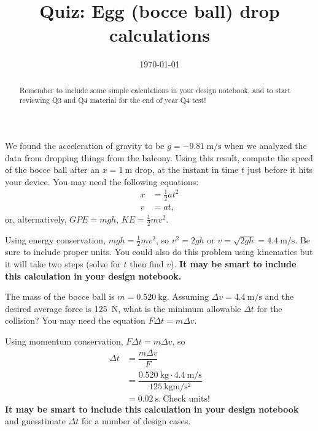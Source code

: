 \documentclass [hw,addpoints,noanswers]{exam}
\title{Quiz: Egg (bocce ball) drop calculations}
\author{\mobeardInstructorShort}
\date{\today}
\begin{document}
\maketitle

\begin{abstract}
Remember to include some simple calculations in your design notebook, and to start reviewing Q3 and Q4 material for the end of year Q4 test! 
\end{abstract}

\begin{questions}
\question[3] We found the acceleration of gravity to be $g=\SI{-9.81}{\meter\per\second}$ when we analyzed the data from dropping things from the balcony. Using this result, compute the speed of the bocce ball after an $x=\SI{1}{\meter}$ drop, at the instant in time $t$ just before it hits your device. You may need the following equations: 
\begin{align*}
x &= \frac{1}{2} a t^2 \\
v &= a t,
\end{align*}
or, alternatively, $GPE=mgh$, $KE=\frac{1}{2}mv^2$.
\begin{solution}[2.5in]
Using energy conservation, $mgh=\frac{1}{2}mv^2$, so $v^2 = 2gh$ or $v=\sqrt{2 g h}=\SI{4.4}{\meter\per\second}.$ Be sure to include proper units. You could also do this problem using kinematics but it will take two steps (solve for $t$ then find $v$). \textbf{It may be smart to include this calculation in your design notebook.}
\end{solution}

\question[2] The mass of the bocce ball is $m=\SI{0.520}{\kilo\gram}$. Assuming $\Delta v=\SI{4.4}{\meter\per\second}$ and the desired average force is \SI{125}{\newton}, what is the minimum allowable $\Delta t$ for the collision? You may need the equation $F \Delta t = m \Delta v$. 
\begin{solution}[2.5in]
Using momentum conservation, $F \Delta t = m \Delta v$, so
\begin{align*}
\Delta t &= \dfrac{m \Delta v}{F} \\
&= \dfrac{\SI{0.520}{\kilo\gram} \cdot \SI{4.4}{\meter\per\second}}{\SI{125}{\kilo\gram\meter\per\second\squared}} \\
&= \SI{0.02}{\second}.\ \text{Check units!} 
\end{align*}
\textbf{It may be smart to include this calculation in your design notebook} and guesstimate $\Delta t$ for a number of design cases. 
\end{solution}
\end{questions}
\end{document}
